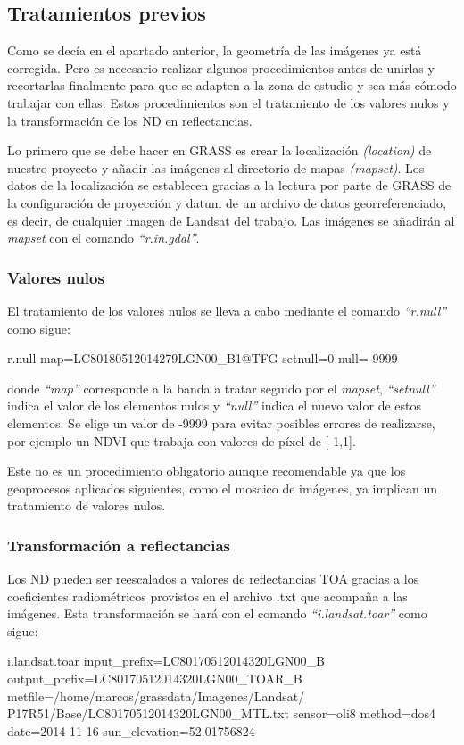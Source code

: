 \subsection{Tratamientos previos}
Como se decía en el apartado anterior, la geometría de las imágenes ya está corregida. Pero es necesario realizar algunos procedimientos antes de unirlas y recortarlas finalmente para que se adapten a la zona de estudio y sea más cómodo trabajar con ellas. Estos procedimientos son el tratamiento de los valores nulos y la transformación de los \ac{ND} en reflectancias.\Sep

Lo primero que se debe hacer en GRASS es crear la localización \textit{(location)} de nuestro proyecto y añadir las imágenes al directorio de mapas \textit{(mapset)}. Los datos de la localización se establecen gracias a la lectura por parte de GRASS de la configuración de proyección y datum de un archivo de datos georreferenciado, es decir, de cualquier imagen de Landsat del trabajo. Las imágenes se añadirán al \textit{mapset} con el comando \textit{``r.in.gdal''}.

\subsubsection{Valores nulos}
El tratamiento de los valores nulos se lleva a cabo mediante el comando \textit{``r.null''} como sigue:

\begin{center}
\begin{boxedverbatim}
	r.null map=LC80180512014279LGN00_B1@TFG setnull=0 null=-9999
\end{boxedverbatim}
\end{center}

donde \textit{``map''} corresponde a la banda a tratar seguido por el \textit{mapset}, \textit{``setnull''} indica el valor de los elementos nulos y \textit{``null''} indica el nuevo valor de estos elementos. Se elige un valor de -9999 para evitar posibles errores de realizarse, por ejemplo un \ac{NDVI} que trabaja con valores de píxel de [-1,1].\Sep

Este no es un procedimiento obligatorio aunque recomendable ya que los geoprocesos aplicados siguientes, como el mosaico de imágenes, ya implican un tratamiento de valores nulos.

\subsubsection{Transformación a reflectancias}
Los \ac{ND} pueden ser reescalados a valores de reflectancias \ac{TOA} gracias a los coeficientes radiométricos provistos en el archivo .txt que acompaña a las imágenes. Esta transformación se hará con el comando \textit{``i.landsat.toar''} como sigue:
\begin{center}
\begin{boxedverbatim}
	i.landsat.toar
	input_prefix=LC80170512014320LGN00_B
	output_prefix=LC80170512014320LGN00_TOAR_B
	metfile=/home/marcos/grassdata/Imagenes/Landsat/
	P17R51/Base/LC80170512014320LGN00_MTL.txt
	sensor=oli8
	method=dos4
	date=2014-11-16
	sun_elevation=52.01756824
\end{boxedverbatim}
\end{center}

